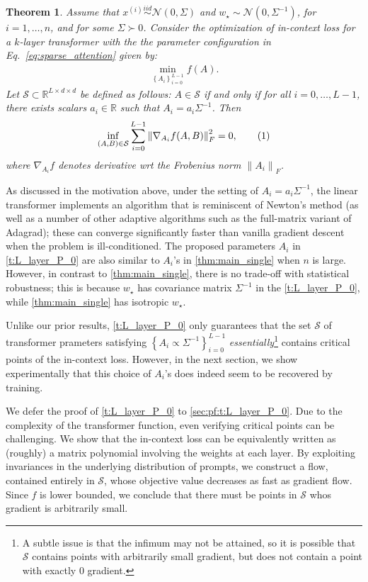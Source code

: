 \documentclass{article}
\newcommand{\R}{\mathbb{R}}
\renewcommand{\S}{{\mathcal S}}
\newtheorem{theorem}{Theorem}
\newcommand{\bb}{A}
\newcommand{\wstar}{w_\star}
\newcommand{\tx}[1]{x^{(#1)}}
\newcommand*\lrn[1]{\left\| #1 \right\|}
\newcommand*\lrp[1]{\left( #1 \right)}
\newcommand*\lrbb[1]{\left\{ #1 \right\}}
\newcommand\numberthis{\addtocounter{equation}{1}\tag{\theequation}}
\begin{document}
\begin{theorem}\label{t:L_layer_P_0}  
Assume that $\tx{i} \overset{iid}{\sim} \mathcal{N}(0,\Sigma)$ and $\wstar \sim \mathcal{N}(0,\Sigma^{-1})$, for $i=1,\dots, n$, and for some $\Sigma \succ 0$. Consider the optimization of in-context loss for a $k$-layer transformer with the the parameter configuration in Eq.~\eqref{eq:sparse_attention} given by:
\begin{align}
\min_{\lrbb{A_i}_{i=0}^{L-1}} f \lrp{A}.
\end{align}
Let $\S \subset \R^{L \times d \times d}$ be defined as follows: $A \in \S$ if and only if for all $i = 0,\dots,L-1$, there exists scalars $a_i\in \R$ such that $A_i = a_i \Sigma^{-1}$. Then
\begin{align*}
\inf_{(A,B) \in \S} \sum_{i=0}^{L-1} \lrn{\nabla_{A_i} f(A,B)}_F^2 = 0,
\numberthis \label{e:T:near-stationarity_P0}
\end{align*}
where $\nabla_{A_i} f$ denotes derivative wrt the Frobenius norm $\lrn{A_i}_F$.

\end{theorem}


As discussed in the motivation above, under the setting of $A_i = a_i \Sigma^{-1}$, the linear transformer implements an algorithm that is reminiscent of Newton's method (as well as a number of other adaptive algorithms such as the full-matrix variant of Adagrad); these can converge significantly faster than vanilla gradient descent when the problem is ill-conditioned. The proposed parameters $A_i$ in \autoref{t:L_layer_P_0} are also similar to $\bb_i$'s in \autoref{thm:main_single} when $n$ is large. However, in contrast to \autoref{thm:main_single}, there is no trade-off with statistical robustness; this is because $\wstar$ has covariance matrix $\Sigma^{-1}$ in the \autoref{t:L_layer_P_0}, while \autoref{thm:main_single} has isotropic $\wstar$.

Unlike our prior results, \autoref{t:L_layer_P_0} only guarantees that the set $\S$ of transformer prameters satisfying $\lrbb{A_i \propto \Sigma^{-1}}_{i=0}^{L-1}$ \emph{essentially}\footnote{A subtle issue is that the infimum may not be attained, so it is possible that $\S$ contains points with arbitrarily small gradient, but does not contain a point with exactly $0$ gradient.} contains critical points of the in-context loss. However, in the next section, we show experimentally that this choice of $A_i$'s does indeed seem to be recovered by training. 


We defer the proof of \autoref{t:L_layer_P_0} to \autoref{sec:pf:t:L_layer_P_0}. Due to the complexity of the transformer function, even verifying critical points can be challenging. We show that the in-context loss can be equivalently written as (roughly) a matrix polynomial involving the weights at each layer. By exploiting invariances in the underlying distribution of prompts, we construct a flow, contained entirely in $\S$, whose objective value decreases as fast as gradient flow. Since $f$ is lower bounded, we conclude that there must be points in $\S$ whos gradient is arbitrarily small.
\end{document}
